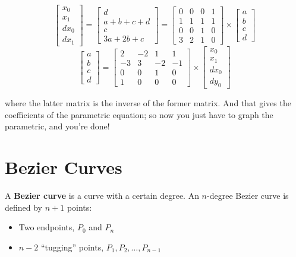 \documentclass[12pt]{article}
\begin{document}
\[ 
\begin{bmatrix}
x_0 \\ x_1 \\ dx_0 \\ dx_1
\end{bmatrix} =
\begin{bmatrix}
d \\ a+b+c+d \\ c \\ 3a + 2b + c 
\end{bmatrix} =
\begin{bmatrix}
0 & 0 & 0 & 1 \\ 1 & 1 & 1 & 1 \\ 0 & 0 & 1 & 0 \\ 3 & 2 & 1 & 0
\end{bmatrix} \times
\begin{bmatrix}
a \\ b \\ c \\ d
\end{bmatrix}
\]
\[
\begin{bmatrix}
a \\ b \\ c \\ d
\end{bmatrix}
=
\begin{bmatrix}
2 & -2 & 1 & 1 \\ -3 & 3 & -2 & -1 \\ 0 & 0 & 1 & 0 \\ 1 & 0 & 0 & 0
\end{bmatrix} \times
\begin{bmatrix}
x_0 \\ x_1 \\ dx_0 \\ dy_0
\end{bmatrix}
\]

where the latter matrix is the inverse of the former matrix. And that gives the coefficients of the parametric equation; so now you just have to graph the parametric, and you're done!

\section{Bezier Curves}
A \textbf{Bezier curve} is a curve with a certain degree. An $n$-degree Bezier curve is defined by $n+1$ points:
\begin{itemize}
\item Two endpoints, $P_0$ and $P_n$
\item $n-2$ ``tugging'' points, $P_1, P_2, \dots, P_{n-1}$
\end{itemize}
\end{document}
